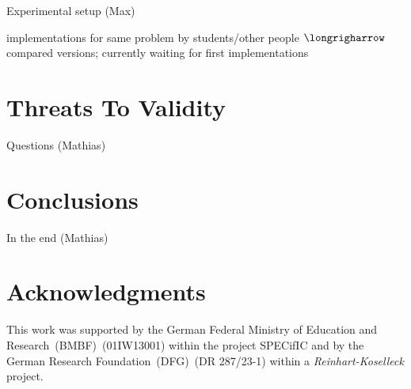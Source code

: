 \documentclass[conference]{IEEEtran}
\begin{document}
\danger Experimental setup (Max)

\danger implementations for same problem by students/other people $\longrigharrow$ compared versions; currently waiting for first implementations

\section{Threats To Validity}
\label{sec:threats-validity}

\danger Questions (Mathias)

\section{Conclusions}
\label{sec:conclusions}

\danger In the end (Mathias)

\section*{Acknowledgments}
\label{sec:acknowledgments}
This work was supported by the German Federal Ministry of Education and
Research~(BMBF)~(01IW13001) within the project SPECifIC and by the German
Research Foundation~(DFG)~(DR 287/23-1) within a \emph{Reinhart-Koselleck}
project.


%
%
\end{document}
